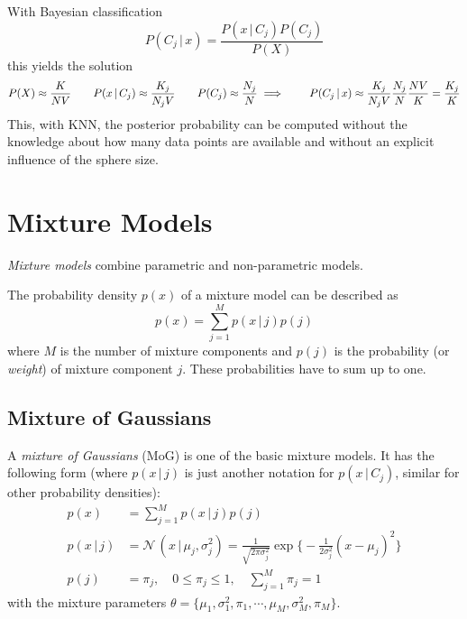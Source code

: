 \documentclass[a4paper, 11pt, accentcolor = tud3b]{tudreport}
\newcommand{\given}{\ensuremath{\,\vert\,}}
\begin{document}
					With Bayesian classification
					\begin{equation}
						P(C_j \given x) = \frac{P(x \given C_j) P(C_j)}{P(X)}
					\end{equation}
					this yields the solution
					\begin{equation}
						P(X) \approx \frac{K}{NV} \qquad P(x \given C_j) \approx \frac{K_j}{N_jV} \qquad P(C_j) \approx \frac{N_j}{N} \\
						\implies\qquad P(C_j \given x) \approx \frac{K_j}{N_jV} \frac{N_j}{N} \frac{NV}{K} = \frac{K_j}{K}
					\end{equation}
					This, with KNN, the posterior probability can be computed without the knowledge about how many data points are available and without an explicit influence of the sphere size.

		\section{Mixture Models}
			\emph{Mixture models} combine parametric and non-parametric models.

			The probability density \(p(x)\) of a mixture model can be described as
			\begin{equation}
				p(x) = \sum_{j = 1}^{M} p(x \given j) p(j)
			\end{equation}
			where \(M\) is the number of mixture components and \(p(j)\) is the probability (or \emph{weight}) of mixture component \(j\). These probabilities have to sum up to one.

			\subsection{Mixture of Gaussians}
				A \emph{mixture of Gaussians} (MoG) is one of the basic mixture models. It has the following form (where \( p(x \given j) \) is just another notation for \( p(x \given C_j) \), similar for other probability densities):
				\begin{align}
					p(x) &= \sum_{j = 1}^{M} p(x \given j) p(j) \\
					p(x \given j) &= \mathcal{N}\,(x \given \mu_j, \sigma_j^2) = \frac{1}{\sqrt{2\pi\sigma_j^2}} \exp\Bigg\{ -\frac{1}{2\sigma_j^2} (x - \mu_j)^2 \Bigg\} \\
					p(j) &= \pi_j, \quad 0 \leq \pi_j \leq 1, \quad \sum_{j = 1}^{M} \pi_j = 1
				\end{align}
				with the mixture parameters \( \theta = \{ \mu_1, \sigma_1^2, \pi_1, \cdots, \mu_M, \sigma_M^2, \pi_M \} \).
\end{document}
